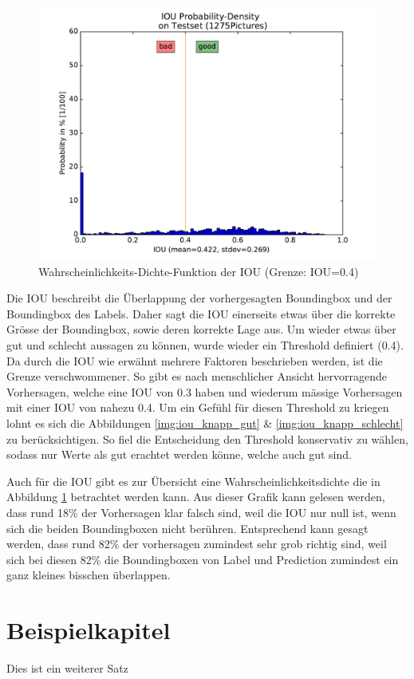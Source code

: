 \documentclass[a4paper,12pt]{article}
\begin{document}
\begin{figure}
	\centering
	\includegraphics[width=.7\textwidth]{BilderResultate/IOUprobDensity.pdf}
	\caption{Wahrscheinlichkeits-Dichte-Funktion der IOU (Grenze: IOU=0.4)}
	\label{img:iou_dichte}
\end{figure}


Die IOU beschreibt die Überlappung der vorhergesagten Boundingbox und der Boundingbox des Labels. 
Daher sagt die IOU einerseits etwas über die korrekte Grösse der Boundingbox, sowie deren korrekte Lage aus. 
Um wieder etwas über gut und schlecht aussagen zu können, wurde wieder ein Threshold definiert (0.4).
Da durch die IOU wie erwähnt mehrere Faktoren beschrieben werden, ist die Grenze verschwommener. 
So gibt es nach menschlicher Ansicht hervorragende Vorhersagen, welche eine IOU von 0.3 haben und wiederum mässige Vorhersagen mit einer IOU von nahezu 0.4.
Um ein Gefühl für diesen Threshold zu kriegen lohnt es sich die Abbildungen \ref{img:iou_knapp_gut} \& \ref{img:iou_knapp_schlecht} zu berücksichtigen.
So fiel die Entscheidung den Threshold konservativ zu wählen, sodass nur Werte als gut erachtet werden könne, welche auch gut sind. 

Auch für die IOU gibt es zur Übersicht eine Wahrscheinlichkeitsdichte die in Abbildung \ref{img:iou_dichte} betrachtet werden kann.
Aus dieser Grafik kann gelesen werden, dass rund 18\% der Vorhersagen klar falsch sind, weil die IOU nur null ist, wenn sich die beiden Boundingboxen nicht berühren. Entsprechend kann gesagt werden, dass rund 82\% der vorhersagen zumindest sehr grob richtig sind, weil sich bei diesen 82\% die Boundingboxen von Label und Prediction zumindest ein ganz kleines bisschen überlappen.  

\newpage
\section{Beispielkapitel}
Dies ist ein weiterer Satz
\end{document}
